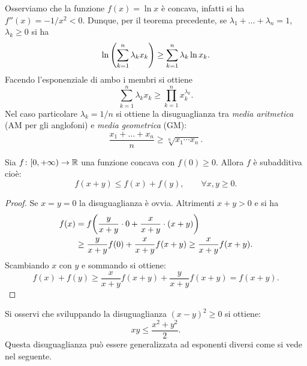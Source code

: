\begin{example}
\mymark{*}
Osserviamo che la funzione $f(x) = \ln x$ è concava, infatti si ha
$f''(x) = -1/x^2 < 0$. Dunque, per il teorema precedente, se $\lambda_1 + \dots + \lambda_n =1$, $\lambda_k \ge 0$ si ha
\[
    \ln{\left( \sum_{k=1}^n \lambda_k x_k \right)}
    \ge \sum_{k=1}^n \lambda_k \ln x_k.
\]
Facendo l'esponenziale di ambo i membri si ottiene
\[
  \sum_{k=1}^n \lambda_k x_k \ge \prod_{k=1}^n x_k^{\lambda_k}.
\]
Nel caso particolare $\lambda_k = 1/n$ si ottiene
la disuguaglianza tra \emph{media aritmetica} (AM per gli anglofoni)
e \emph{media geometrica}
%
%
%
%
%
%
(GM):
\[
  \frac{x_1 + \dots + x_n}{n} \ge \sqrt[n]{x_1\cdots x_n}.
\]
\end{example}

\begin{exercise}
Sia $f\colon [0,+\infty) \to {\mathbb R}$ una funzione concava con $f(0)\ge 0$. Allora $f$ è subadditiva cioè:
\[
  f(x+y) \le f(x) + f(y),\qquad \forall x,y\ge 0.
\]
\end{exercise}
%
\begin{proof}
Se $x=y=0$ la disuguaglianza è ovvia.
Altrimenti $x+y>0$ e si ha
\begin{align*}
f(x) &= f{\left( \frac{y}{x+y}\cdot 0 + \frac{x}{x+y}\cdot (x+y) \right)}\\ &\ge \frac{y}{x+y}f(0) + \frac{x}{x+y}f(x+y)
\ge \frac{x}{x+y}f(x+y).
\end{align*}
Scambiando $x$ con $y$ e sommando si ottiene:
\[
  f(x) + f(y) \ge \frac{x}{x+y}f(x+y) + \frac{y}{x+y}f(x+y) = f(x+y).
\]
\end{proof}

Si osservi che sviluppando la disuguaglianza $(x-y)^2\ge 0$ si ottiene:
\[
  x y \le \frac{x^2 + y^2}{2}.
\]
Questa disuguaglianza può essere generalizzata ad esponenti diversi 
come si vede nel seguente.


